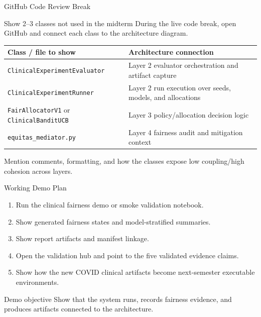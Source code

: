 \documentclass[aspectratio=169,10pt]{beamer}
\begin{document}
\begin{frame}{GitHub Code Review Break}
\begin{block}{Show 2--3 classes not used in the midterm}
During the live code break, open GitHub and connect each class to the architecture diagram.
\end{block}
\begin{center}
\small
\begin{tabular}{p{}p{}}
\toprule
Class / file to show & Architecture connection \\
\midrule
\texttt{ClinicalExperimentEvaluator} & Layer 2 evaluator orchestration and artifact capture \\
\texttt{ClinicalExperimentRunner} & Layer 2 run execution over seeds, models, and allocations \\
\texttt{FairAllocatorV1} or \texttt{ClinicalBanditUCB} & Layer 3 policy/allocation decision logic \\
\texttt{equitas\_mediator.py} & Layer 4 fairness audit and mitigation context \\
\bottomrule
\end{tabular}
\end{center}
\small Mention comments, formatting, and how the classes expose low coupling/high cohesion across layers.
\end{frame}

\begin{frame}{Working Demo Plan}
\begin{enumerate}
    \item Run the clinical fairness demo or smoke validation notebook.
    \item Show generated fairness states and model-stratified summaries.
    \item Show report artifacts and manifest linkage.
    \item Open the validation hub and point to the five validated evidence claims.
    \item Show how the new COVID clinical artifacts become next-semester executable environments.
\end{enumerate}
\begin{block}{Demo objective}
Show that the system runs, records fairness evidence, and produces artifacts connected to the architecture.
\end{block}
\end{frame}
\end{document}
